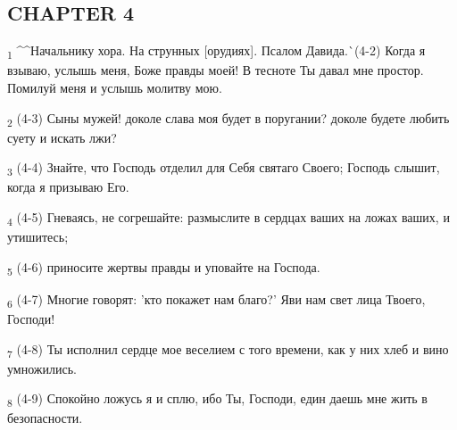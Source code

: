 \subsection{CHAPTER 4}
\begin{tcolorbox}
\textsubscript{1} ^^Начальнику хора. На струнных [орудиях]. Псалом Давида.^^ (4-2) Когда я взываю, услышь меня, Боже правды моей! В тесноте Ты давал мне простор. Помилуй меня и услышь молитву мою.
\end{tcolorbox}
\begin{tcolorbox}
\textsubscript{2} (4-3) Сыны мужей! доколе слава моя будет в поругании? доколе будете любить суету и искать лжи?
\end{tcolorbox}
\begin{tcolorbox}
\textsubscript{3} (4-4) Знайте, что Господь отделил для Себя святаго Своего; Господь слышит, когда я призываю Его.
\end{tcolorbox}
\begin{tcolorbox}
\textsubscript{4} (4-5) Гневаясь, не согрешайте: размыслите в сердцах ваших на ложах ваших, и утишитесь;
\end{tcolorbox}
\begin{tcolorbox}
\textsubscript{5} (4-6) приносите жертвы правды и уповайте на Господа.
\end{tcolorbox}
\begin{tcolorbox}
\textsubscript{6} (4-7) Многие говорят: 'кто покажет нам благо?' Яви нам свет лица Твоего, Господи!
\end{tcolorbox}
\begin{tcolorbox}
\textsubscript{7} (4-8) Ты исполнил сердце мое веселием с того времени, как у них хлеб и вино умножились.
\end{tcolorbox}
\begin{tcolorbox}
\textsubscript{8} (4-9) Спокойно ложусь я и сплю, ибо Ты, Господи, един даешь мне жить в безопасности.
\end{tcolorbox}
